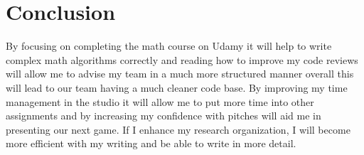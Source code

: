 \documentclass{scrartcl}
\begin{document}
\section{Conclusion}
By focusing on completing the math course on Udamy it will help to write complex math algorithms correctly and reading how to improve my code reviews will allow me to advise my team in a much more structured manner overall this will lead to our team having a much cleaner code base. By improving my time management in the studio it will allow me to put more time into other assignments and by increasing my confidence with pitches will aid me in presenting our next game. If I enhance my research organization, I will become more efficient with my writing and be able to write in more detail.




\end{document}
